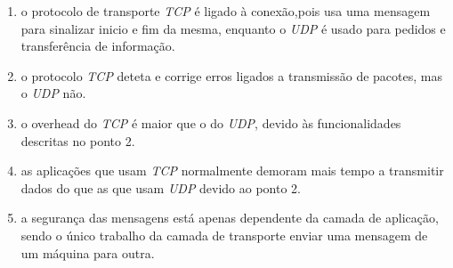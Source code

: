 \documentclass{article}
\begin{document}
\begin{enumerate}
    \item  o protocolo de transporte \textit{TCP} é ligado à conexão,pois usa uma mensagem para sinalizar inicio e fim da mesma, enquanto o \textit{UDP} é usado para pedidos e transferência de informação.
    \item o protocolo \textit{TCP} deteta e corrige erros ligados a transmissão de pacotes, mas o \textit{UDP} não.
    \item o overhead do \textit{TCP} é maior que o do \textit{UDP}, devido às funcionalidades descritas no ponto 2.
    \item as aplicações que usam \textit{TCP} normalmente demoram mais tempo a transmitir dados do que as que usam \textit{UDP} devido ao ponto 2.
    \item a segurança das mensagens está apenas dependente da camada de aplicação, sendo o único trabalho da camada de transporte enviar uma mensagem de um máquina para outra.
\end{enumerate}
\end{document}
